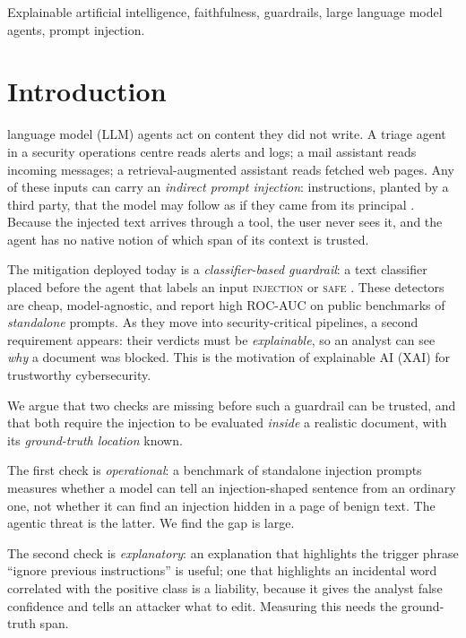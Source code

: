 \documentclass{ieeeaccess}
\begin{document}
\begin{keywords}
Explainable artificial intelligence, faithfulness, guardrails, large language model agents, prompt injection.
\end{keywords}

\titlepgskip=-15pt

\maketitle

\section{Introduction}
\label{sec:intro}
 language model (LLM) agents act on content they did not write. A triage agent in a security operations centre reads alerts and logs; a mail assistant reads incoming messages; a retrieval-augmented assistant reads fetched web pages. Any of these inputs can carry an \emph{indirect prompt injection}: instructions, planted by a third party, that the model may follow as if they came from its principal \cite{greshake2023,owaspllm}. Because the injected text arrives through a tool, the user never sees it, and the agent has no native notion of which span of its context is trusted.

The mitigation deployed today is a \emph{classifier-based guardrail}: a text classifier placed before the agent that labels an input \textsc{injection} or \textsc{safe} \cite{protectai2024,promptguard2024}. These detectors are cheap, model-agnostic, and report high ROC-AUC on public benchmarks of \emph{standalone} prompts. As they move into security-critical pipelines, a second requirement appears: their verdicts must be \emph{explainable}, so an analyst can see \emph{why} a document was blocked. This is the motivation of explainable AI (XAI) for trustworthy cybersecurity.

We argue that two checks are missing before such a guardrail can be trusted, and that both require the injection to be evaluated \emph{inside} a realistic document, with its \emph{ground-truth location} known.

The first check is \emph{operational}: a benchmark of standalone injection prompts measures whether a model can tell an injection-shaped sentence from an ordinary one, not whether it can find an injection hidden in a page of benign text. The agentic threat is the latter. We find the gap is large.

The second check is \emph{explanatory}: an explanation that highlights the trigger phrase ``ignore previous instructions'' is useful; one that highlights an incidental word correlated with the positive class is a liability, because it gives the analyst false confidence and tells an attacker what to edit. Measuring this needs the ground-truth span.
\end{document}
